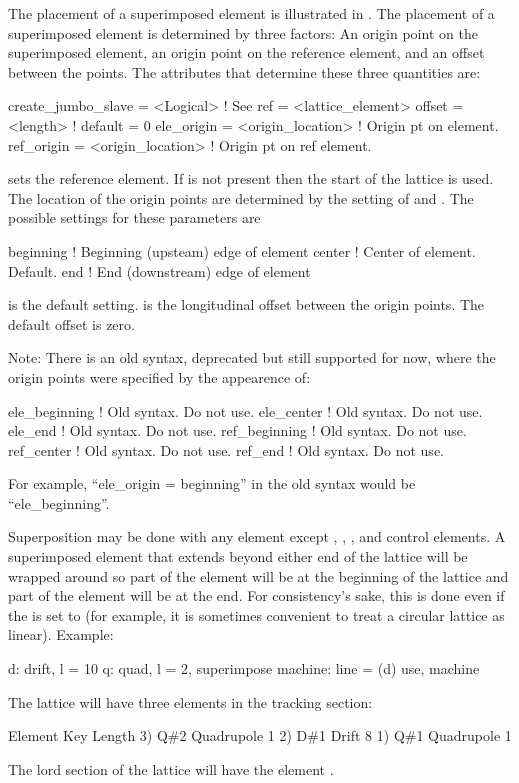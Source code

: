 The placement of a superimposed element is illustrated in
. The placement of a superimposed element is
determined by three factors: An origin point on the superimposed
element, an origin point on the reference element, and an offset between
the points. The attributes that determine these three quantities are:
\begin{example}
  create_jumbo_slave = <Logical>     ! See 
  ref          = <lattice_element>
  offset       = <length>            ! default = 0
  ele_origin   = <origin_location>   ! Origin pt on element.
  ref_origin   = <origin_location>   ! Origin pt on ref element.
\end{example}
 sets the reference element. If  is not present then
the start of the lattice is used. The location of the origin points
are determined by the setting of  and .
The possible settings for these parameters are
\begin{example}
  beginning       ! Beginning (upsteam) edge of element
  center          ! Center of element. Default.
  end             ! End (downstream) edge of element
\end{example}
 is the default setting.
 is the longitudinal offset
between the origin points. The default offset is zero.

Note: There is an old syntax, deprecated but still supported for now,
where the origin points were specified by the appearence of:
\begin{example}
  ele_beginning         ! Old syntax. Do not use.
  ele_center            ! Old syntax. Do not use.
  ele_end               ! Old syntax. Do not use.
  ref_beginning         ! Old syntax. Do not use.
  ref_center            ! Old syntax. Do not use.
  ref_end               ! Old syntax. Do not use.
\end{example}
For example, ``ele_origin = beginning'' in the old syntax would be ``ele_beginning''.

Superposition may be done with any element except ,
, , and  control elements. A
superimposed element that extends beyond either end of the lattice
will be wrapped around so part of the element will be at the beginning
of the lattice and part of the element will be at the end. For
consistency's sake, this is done even if the  is set
to  (for example, it is sometimes convenient to
treat a circular lattice as linear). Example:
\begin{example}
  d: drift, l = 10
  q: quad, l = 2, superimpose
  machine: line = (d)
  use, machine
\end{example}
The lattice will have three elements in the tracking section:
\begin{example}
        Element   Key           Length
  3)    Q{\#}2       Quadrupole    1
  2)    D{\#}1       Drift         8
  1)    Q{\#}1       Quadrupole    1
\end{example}
The lord section of the lattice will have the element . 

